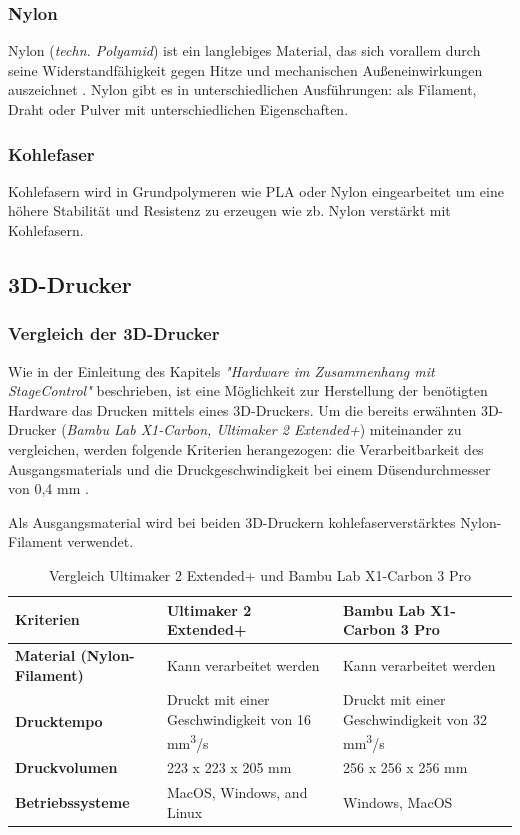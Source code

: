 \subsubsection{Nylon}
Nylon (\textit{techn. Polyamid}) ist ein langlebiges Material, das sich vorallem durch seine Widerstandfähigkeit gegen Hitze und mechanischen Außeneinwirkungen auszeichnet \parencite{Nylon}. Nylon gibt es in unterschiedlichen Ausführungen: als Filament, Draht oder Pulver mit unterschiedlichen Eigenschaften. 
\subsubsection{Kohlefaser}
Kohlefasern wird in Grundpolymeren wie PLA oder Nylon eingearbeitet \parencite{Kohlefasern} um eine höhere Stabilität und Resistenz zu erzeugen wie zb. Nylon verstärkt mit Kohlefasern.\\



\subsection{3D-Drucker}

\subsubsection{Vergleich der 3D-Drucker}
Wie in der Einleitung des Kapitels \textit{"Hardware im Zusammenhang mit StageControl"} beschrieben, ist eine Möglichkeit zur Herstellung der benötigten Hardware das Drucken mittels eines 3D-Druckers. Um die bereits erwähnten 3D-Drucker (\textit{Bambu Lab X1-Carbon, Ultimaker 2 Extended+})  \parencite{Ultimaker2ExtendedSpecification} miteinander zu vergleichen, werden folgende Kriterien herangezogen: die Verarbeitbarkeit des Ausgangsmaterials und die Druckgeschwindigkeit bei einem Düsendurchmesser von 0,4 mm \parencite{BambuLabX1Carbon3DPrinterSpecifications}. 

Als Ausgangsmaterial wird bei beiden 3D-Druckern kohlefaserverstärktes Nylon-Filament verwendet.

\begin{table} [H]
	\begin{tabular}{ |p{2.7cm} |p{4.8cm}|p{4.8cm}| }
		\hline
		\textbf{Kriterien} & \textbf{Ultimaker 2 Extended+}& \textbf{Bambu Lab X1-Carbon 3 Pro}\\
		\hline
		\textbf{Material (Nylon-Filament)} & Kann verarbeitet werden & Kann verarbeitet werden   \\ 
		\hline
		\textbf{Drucktempo} & Druckt mit einer Geschwindigkeit von 16 mm\textsuperscript{3}/s &
		Druckt mit einer Geschwindigkeit von 32 mm\textsuperscript{3}/s   \\  
		\hline
		\textbf{Druckvolumen} & 223 x 223 x 205 mm & 256 x 256 x 256 mm \\
		\hline
		\textbf{Betriebssysteme} & MacOS, Windows, and Linux & Windows, MacOS \\
		\hline
	\end{tabular}
	\caption{Vergleich  Ultimaker 2 Extended+ und Bambu Lab X1-Carbon 3 Pro}
\end{table}


